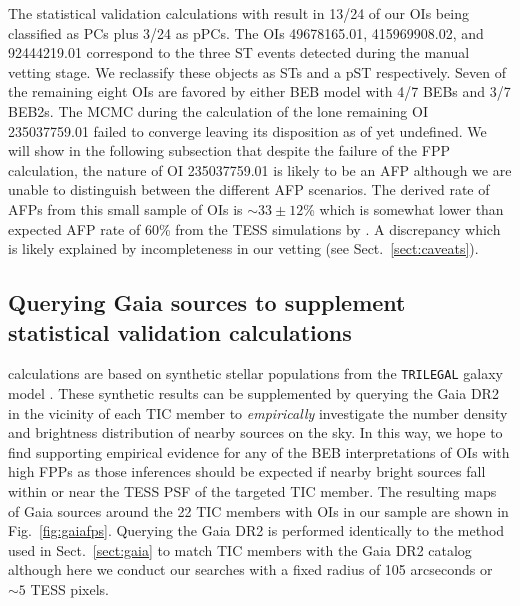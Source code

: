 The statistical validation calculations with \vespa{} result in 13/24 of our
OIs being classified as PCs plus 3/24 as pPCs.
The OIs 49678165.01, 415969908.02, and 92444219.01 correspond to the three
ST events detected during the manual vetting stage. We reclassify these objects as STs and a pST
respectively. Seven of the remaining eight OIs are favored by either BEB
model with 4/7 BEBs and 3/7 BEB2s. The
MCMC during the \vespa{} calculation of the lone remaining OI 235037759.01 failed to converge
leaving its disposition as of yet undefined. We will
show in the following subsection that despite the failure of the FPP calculation, the nature of OI
235037759.01 is likely to be an AFP although we are unable to distinguish between the different
AFP scenarios. The derived rate of AFPs from this small sample of OIs is $\sim 33\pm 12$\% which
is somewhat lower than expected AFP rate of 60\% from the TESS simulations by \citep{sullivan15}.
A discrepancy which is likely explained by incompleteness in our vetting (see Sect.~\ref{sect:caveats}).


\subsection{Querying Gaia sources to supplement statistical validation calculations} \label{sect:gaiafps}
\vespa{} calculations are based on synthetic stellar populations from the
\texttt{TRILEGAL} galaxy model \citep{girardi05}. These synthetic results can be supplemented
by querying the Gaia DR2 in the vicinity of each TIC member to \emph{empirically}
investigate the number density and brightness
distribution of nearby sources on the sky. In this way, we hope to find supporting empirical evidence for
any of the BEB interpretations of OIs with high FPPs as those inferences should be expected if nearby bright
sources fall within or near the TESS PSF of the targeted TIC member. The resulting maps of Gaia sources around
the 22 TIC members with OIs in our sample are shown in Fig.~\ref{fig:gaiafps}. Querying the Gaia DR2 is
performed identically to the method used in Sect.~\ref{sect:gaia} to match TIC members with the Gaia DR2 catalog
although here we conduct our searches with a fixed radius of 105 arcseconds or $\sim 5$ TESS pixels. \\


